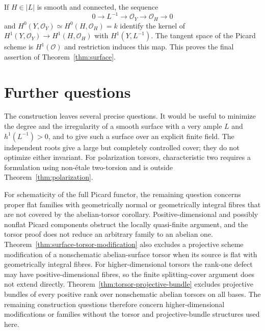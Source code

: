 \documentclass[11pt]{article}
\theoremstyle{remark}\newtheorem{remark}[theorem]{Remark}
\newcommand{\OO}{\mathcal O}
\begin{document}
If $H\in|L|$ is smooth and connected, the sequence
\[
 0\longrightarrow L^{-1}\longrightarrow\OO_Y
   \longrightarrow\OO_H\longrightarrow0
\]
and $H^0(Y,\OO_Y)\simeq H^0(H,\OO_H)=k$ identify the kernel of $H^1(Y,\OO_Y)\to H^1(H,\OO_H)$ with $H^1(Y,L^{-1})$. The tangent space of the Picard scheme is $H^1(\OO)$ and restriction induces this map. This proves the final assertion of Theorem~\ref{thm:surface}.




























\section{Further questions}

The construction leaves several precise questions. It would be useful to minimize the degree and the irregularity of a smooth surface with a very ample $L$ and $h^1(L^{-1})>0$, and to give such a surface over an explicit finite field. The independent roots give a large but completely controlled cover; they do not optimize either invariant. For polarization torsors, characteristic two requires a formulation using non-\'etale two-torsion and is outside Theorem~\ref{thm:polarization}.

For schematicity of the full Picard functor, the remaining question concerns proper flat families with geometrically normal or geometrically integral fibres that are not covered by the abelian-torsor corollary. Positive-dimensional and possibly nonflat Picard components obstruct the locally quasi-finite argument, and the torsor proof does not reduce an arbitrary family to an abelian one. Theorem~\ref{thm:surface-torsor-modification} also excludes a projective scheme modification of a nonschematic abelian-surface torsor when its source is flat with geometrically integral fibres. For higher-dimensional torsors the rank-one defect may have positive-dimensional fibres, so the finite splitting-cover argument does not extend directly. Theorem~\ref{thm:torsor-projective-bundle} excludes projective bundles of every positive rank over nonschematic abelian torsors on all bases. The remaining construction questions therefore concern higher-dimensional modifications or families without the torsor and projective-bundle structures used here.
\end{document}
